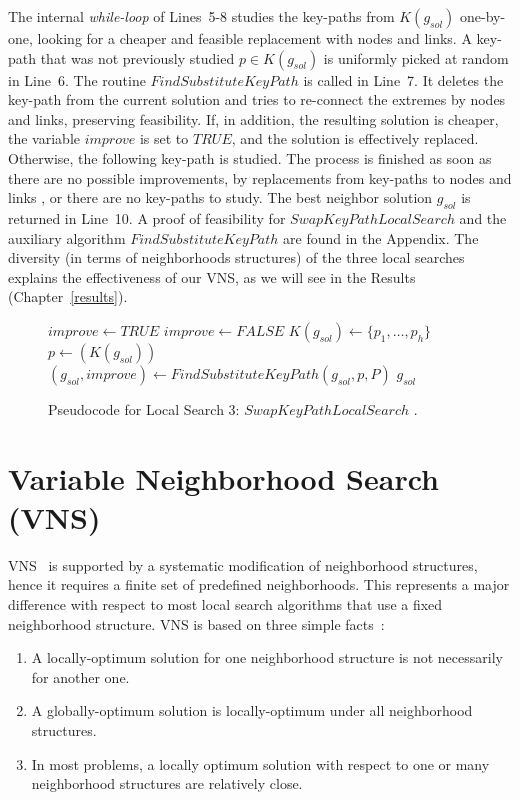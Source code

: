 The internal \textit{while-loop} of Lines~5-8 studies the key-paths from 
$K(g_{sol})$ one-by-one, looking for a cheaper and feasible replacement with nodes and links. A key-path that 
was not previously studied $p\in K (g_{sol})$ is uniformly picked at random in Line~6. 
The routine $FindSubstituteKeyPath$ is called in Line~7. It deletes the key-path from the current solution and tries to re-connect the extremes by nodes and links, preserving feasibility. If, in addition, 
the resulting solution is cheaper, the variable $improve$ is set to $TRUE$, and the solution is effectively replaced. Otherwise,  the following key-path is studied. 
The process is finished as soon as there are no possible improvements, by replacements from key-paths 
to nodes and links , or there are no key-paths to study. 
The best neighbor solution $g_{sol}$ is returned in Line~10. 
A proof of feasibility for $SwapKeyPathLocalSearch$ and the auxiliary algorithm 
$FindSubstituteKeyPath$ are found in the Appendix. The diversity (in terms of neighborhoods structures) of the three local searches 
explains the effectiveness of our VNS, as we will see in the Results (Chapter~\ref{results}).

\begin{figure}[H]
\begin{algorithm}[H]
\caption{$g_{sol} = SwapKeyPathLocalSearch(G_B,C,g_{sol},P)$}
\begin{algorithmic}[1]
\STATE $improve \leftarrow TRUE$
\STATE $improve \leftarrow FALSE$
\STATE $K(g_{sol}) \leftarrow \{p_1,\ldots,p_h\}$ 
\STATE $p \leftarrow(K(g_{sol}))$ 
\STATE $(g_{sol},improve) \leftarrow FindSubstituteKeyPath(g_{sol},p,P)$
\ENDWHILE
\ENDWHILE
\RETURN $g_{sol}$
\end{algorithmic}
\end{algorithm}
\caption{Pseudocode for Local Search 3: $SwapKeyPathLocalSearch$ \cite{11}.\label{alg-kpls2}}
\end{figure}

\section{Variable Neighborhood Search (VNS)}
VNS~\cite{5,16,17,18} is supported by a systematic modification of 
neighborhood structures, hence it requires a finite set of predefined neighborhoods. This represents 
a major difference with respect to most local search algorithms that use a fixed neighborhood structure.  
VNS is based on three simple facts~\cite{5}:
\begin{enumerate}
\item A locally-optimum solution for one neighborhood structure is not necessarily for another one.
\item A globally-optimum solution is locally-optimum under all neighborhood structures.
\item In most problems, a locally optimum solution with respect to one or many neighborhood structures are relatively close.
\end{enumerate}

